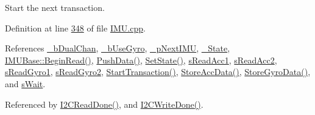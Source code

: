 Start the next transaction. 



Definition at line \hyperlink{_i_m_u_8cpp_source_l00348}{348} of file \hyperlink{_i_m_u_8cpp_source}{IMU.cpp}.



References \hyperlink{_i_m_u_8h_source_l00090}{\_\-bDualChan}, \hyperlink{_i_m_u_8h_source_l00100}{\_\-bUseGyro}, \hyperlink{_i_m_u_8h_source_l00114}{\_\-pNextIMU}, \hyperlink{_i_m_u_8h_source_l00085}{\_\-State}, \hyperlink{class_i_m_u_base_a55327f28a0ad5e54d94f0c698b04827a}{IMUBase::BeginRead()}, \hyperlink{_i_m_u_8cpp_source_l00594}{PushData()}, \hyperlink{_i_m_u_8h_source_l00178}{SetState()}, \hyperlink{_i_m_u_8h_source_l00048}{sReadAcc1}, \hyperlink{_i_m_u_8h_source_l00050}{sReadAcc2}, \hyperlink{_i_m_u_8h_source_l00047}{sReadGyro1}, \hyperlink{_i_m_u_8h_source_l00049}{sReadGyro2}, \hyperlink{_i_m_u_8cpp_source_l00323}{StartTransaction()}, \hyperlink{_i_m_u_8cpp_source_l00588}{StoreAccData()}, \hyperlink{_i_m_u_8cpp_source_l00581}{StoreGyroData()}, and \hyperlink{_i_m_u_8h_source_l00046}{sWait}.



Referenced by \hyperlink{_i_m_u_8cpp_source_l00446}{I2CReadDone()}, and \hyperlink{_i_m_u_8cpp_source_l00432}{I2CWriteDone()}.


